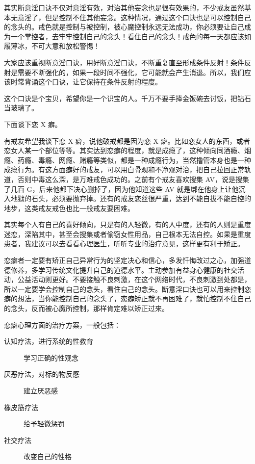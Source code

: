\documentclass{ctexart}
\begin{document}
其实断意淫口诀不仅对意淫有效，对治其他妄念也是很有效果的，不少戒友虽然基本无意淫了，但是控制不住其他妄念。这种情况，通过这个口诀也是可以控制自己的念头的。戒色就是控制与被控制，被心魔控制永远无法成功，你必须要让自己成为一个掌控者，去牢牢控制自己的念头！看住自己的念头！戒色的每一天都应该如履薄冰，不可大意和放松警惕！

大家应该重视断意淫口诀，用好断意淫口诀，不断重复直至形成条件反射！条件反射是需要不断强化的，如果一段时间不强化，它可能就会产生消退。所以，我们应该时常背诵这个口诀，让它保持在条件反射的程度。

这个口诀是个宝贝，希望你是一个识宝的人。千万不要手捧金饭碗去讨饭，把钻石当玻璃了。

下面谈下恋 X 癖。

有戒友希望我谈下恋 X 癖，说他破戒都是因为恋 X 癖。比如恋女人的东西，或者恋女人某一个部位等等。其实达到恋癖的程度，就是成瘾了，这种倾向同酒瘾、烟瘾、药瘾、毒瘾、网瘾、赌瘾等类似，都是一种成瘾行为，当然撸管本身也是一种成瘾行为。有这方面癖好的戒友，可以用白骨观和不净观对治，把自己拉回正常轨道，否则中毒这么深，是万难戒色成功的。之前有个戒友喜欢搜集 AV，说是搜集了几百 G，后来他都下决心删掉了，因为他知道这些 AV 就是绑在他身上让他沉入地狱的石头，必须要抛弃掉。还有的戒友恋丝很严重，达到不能自拔不能自控的地步，这类戒友戒色也比一般戒友要困难。

其实每个人有自己的喜好倾向，只是有的人轻微，有的人中度，还有的人则是重度迷恋，深陷其中，甚至会搜集或者偷窃女性用品，自己根本无法自控。如果是重度患者，我建议可以去看看心理医生，听听专业的治疗意见，这样更有利于矫正。

恋癖者一定要有矫正自己异常行为的坚定决心和信心，多发忏悔改过之心，加强道德修养，多学习传统文化提升自己的道德水平。主动参加有益身心健康的社交活动，公益活动则更好。不要接触不良刺激，在这个网络时代，不良刺激到处都是，所以一定要学会控制自己的念头，看住自己的念头。断意淫口诀也可以用来控制恋癖的想法，当你能控制自己的念头了，恋癖矫正就不再困难了，就怕控制不住自己的念头，反而被心魔所控制，那样肯定难以矫正过来。

恋癖心理方面的治疗方案，一般包括：

\begin{description}
    \item [认知疗法，进行系统的性教育] 学习正确的性观念
    \item [厌恶疗法，对标的物反感] 建立厌恶感
    \item [橡皮筋疗法] 给予轻微惩罚
    \item [社交疗法] 改变自己的性格
\end{description}
\end{document}
